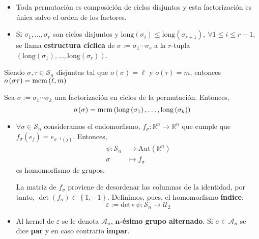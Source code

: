     \begin{prop}
        \begin{itemize}
        \item Toda permutación es composición de ciclos disjuntos y esta factorización es única salvo el orden de los factores.
        \item Si $\sigma_1, \ldots, \sigma_r$ son ciclos disjuntos y $\mathrm{long}\left( \sigma_i \right) \le \mathrm{long}\left( \sigma_{r+1} \right),\ \forall 1 \le i \le r-1$, se llama \textbf{estructura cíclica} de $\sigma := \sigma_1 \cdots \sigma_r$ a la $r$-tupla $\left( \mathrm{long}\left( \sigma_1 \right), \ldots, \mathrm{long}\left( \sigma_r \right) \right)$.
        \end{itemize}
    \end{prop}

    \begin{lema}
        Siendo $\sigma, \tau \in \mathcal{S}_n$ disjuntas tal que $o\left( \sigma \right) = \ell$ y $o\left( \tau \right) = m$, entonces $o\left( \sigma \tau \right) = \operatorname{mcm}\left( \ell, m \right)$
    \end{lema}

    \begin{coro}
        Sea $\sigma := \sigma_1 \cdots \sigma_k$ una factorización en ciclos de la permutación. Entonces,
        \[
        o\left( \sigma \right) = \operatorname{mcm}\left( \mathrm{long}\left( \sigma_1 \right), \ldots, \mathrm{long}\left( \sigma_k \right) \right)
        \]
    \end{coro}

    \begin{defi}[Índice]
        \begin{itemize}
        \item $\forall \sigma \in \mathcal{S}_n$ consideramos el endomorfismo, $f_{\sigma} : \mathbb{R}^n \rightarrow \mathbb{R}^n$ que cumple que $f_{\sigma}\left( e_j \right) = e_{\sigma^{-1}\left( j \right)}$. Entonces,
        \begin{align*}
            \psi: \mathcal{S}_n &\rightarrow \mathrm{Aut}\left( \mathbb{R}^n \right)\\
            \sigma &\mapsto f_{\sigma}
        \end{align*}
        es homomorfismo de grupos.

        La matriz de $f_{\sigma}$ proviene de desordenar las columnas de la identidad, por tanto, $\det \left( f_{\sigma} \right) \in \left\{ 1, -1 \right\}$. Definimos, pues, el homomorfismo \textbf{índice}:
        \[
            \varepsilon := \mathrm{det} \circ \psi: \mathcal{S}_n \rightarrow \mathcal{U}_2
        \]

        \item Al kernel de $\varepsilon$ se le denota $\mathcal{A}_n$, \textbf{$\mathbf{n}$-ésimo grupo alternado}. Si $\sigma \in \mathcal{A}_n$ se dice \textbf{par} y en caso contrario \textbf{impar}.
        \end{itemize} 
    \end{defi}

